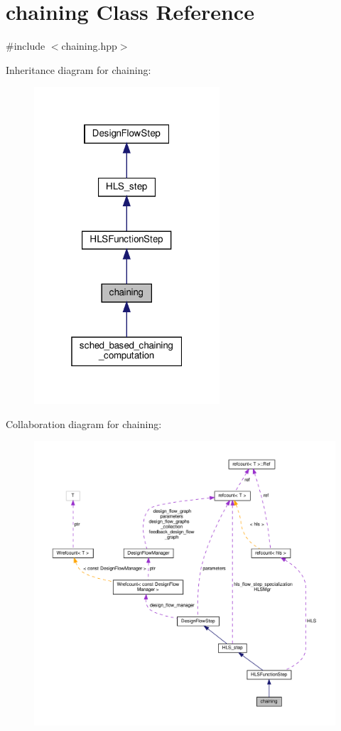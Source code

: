 \hypertarget{classchaining}{}\section{chaining Class Reference}
\label{classchaining}


{\ttfamily \#include $<$chaining.\+hpp$>$}



Inheritance diagram for chaining\+:
\nopagebreak
\begin{figure}[H]
\begin{center}
\leavevmode
\includegraphics[width=196pt]{db/db6/classchaining__inherit__graph}
\end{center}
\end{figure}


Collaboration diagram for chaining\+:
\nopagebreak
\begin{figure}[H]
\begin{center}
\leavevmode
\includegraphics[width=350pt]{de/db7/classchaining__coll__graph}
\end{center}
\end{figure}
